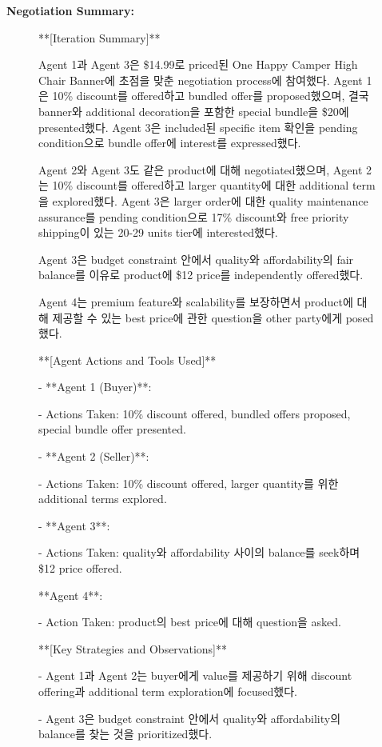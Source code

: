 \textbf{Negotiation Summary:}
\begin{figure}[htbp]
\centering
\begin{tcolorbox}[colback=orange!2!white, colframe=gray!50!orange]
\begin{minipage}{\linewidth}
\small
**[Iteration Summary]**

Agent 1과 Agent 3은 \$14.99로 priced된 One Happy Camper High Chair Banner에 초점을 맞춘 negotiation process에 참여했다. Agent 1은 10\% discount를 offered하고 bundled offer를 proposed했으며, 결국 banner와 additional decoration을 포함한 special bundle을 \$20에 presented했다. Agent 3은 included된 specific item 확인을 pending condition으로 bundle offer에 interest를 expressed했다.

Agent 2와 Agent 3도 같은 product에 대해 negotiated했으며, Agent 2는 10\% discount를 offered하고 larger quantity에 대한 additional term을 explored했다. Agent 3은 larger order에 대한 quality maintenance assurance를 pending condition으로 17\% discount와 free priority shipping이 있는 20-29 units tier에 interested했다.

Agent 3은 budget constraint 안에서 quality와 affordability의 fair balance를 이유로 product에 \$12 price를 independently offered했다.

Agent 4는 premium feature와 scalability를 보장하면서 product에 대해 제공할 수 있는 best price에 관한 question을 other party에게 posed했다.

**[Agent Actions and Tools Used]**

- **Agent 1 (Buyer)**:

- Actions Taken: 10\% discount offered, bundled offers proposed, special bundle offer presented.

- **Agent 2 (Seller)**:

- Actions Taken: 10\% discount offered, larger quantity를 위한 additional terms explored.

- **Agent 3**:

- Actions Taken: quality와 affordability 사이의 balance를 seek하며 \$12 price offered.

**Agent 4**:

- Action Taken: product의 best price에 대해 question을 asked.

**[Key Strategies and Observations]**

- Agent 1과 Agent 2는 buyer에게 value를 제공하기 위해 discount offering과 additional term exploration에 focused했다.

- Agent 3은 budget constraint 안에서 quality와 affordability의 balance를 찾는 것을 prioritized했다.


\end{minipage}
\end{tcolorbox}
\end{figure}
